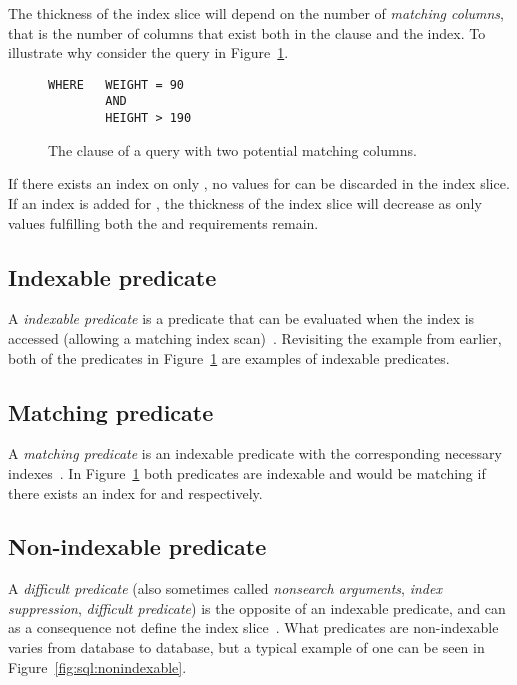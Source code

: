 The thickness of the index slice will depend on the number of \textit{matching columns}, that is the number of columns that exist both in the  clause and the index. To illustrate why consider the query in Figure~\ref{fig:sql:indexslice}.

\begin{figure}[ht]
\begin{verbatim}
WHERE   WEIGHT = 90
        AND
        HEIGHT > 190
\end{verbatim}
\caption[The  clause of a query with two potential matching columns]{The  clause of a query with two potential matching columns.}\label{fig:sql:indexslice}
\end{figure}

If there exists an index on only , no values for  can be discarded in the index slice. If an index is added for , the thickness of the index slice will decrease as only values fulfilling both the  and  requirements remain.

\subsection*{Indexable predicate}
A \textit{indexable predicate} is a predicate that can be evaluated when the index is accessed (allowing a matching index scan)~\cite{2014_summary_sopp, 2013_ibm_ikcianp}. Revisiting the example from earlier, both of the predicates in Figure~\ref{fig:sql:indexslice} are examples of indexable predicates.

\subsection*{Matching predicate}
A \textit{matching predicate} is an indexable predicate with the corresponding necessary indexes~\cite{2013_ibm_ikcianp}. In Figure~\ref{fig:sql:indexslice} both predicates are indexable and would be matching if there exists an index for  and  respectively.

\subsection*{Non-indexable predicate}
A \textit{difficult predicate} (also sometimes called \textit{nonsearch arguments}, \textit{index suppression}, \textit{difficult predicate}) is the opposite of an indexable predicate, and can as a consequence not define the index slice~\cite{lahdenmaki_2005_relational_rdidatodossea}. What predicates are non-indexable varies from database to database, but a typical example of one can be seen in Figure~\ref{fig:sql:nonindexable}.

